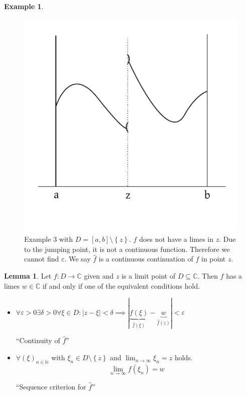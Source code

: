 \documentclass[a4paper,landscape,twocolumn]{article}
\theoremstyle{definition}
\newtheorem{ex}{Example}
\newtheorem{lemma}{Lemma}
\newcommand\set[1]{\left\{#1\right\}}
\newcommand\abs[1]{\left|#1\right|}
\newcommand\seq[1]{{\left(#1\right)}_{n \in \mathbb N}}
\begin{document}
\begin{ex}
\begin{figure}[p]
\begin{center}
      \includegraphics{img/continuity_example_3.pdf}
      \caption{
        Example 3 with $D = [a, b] \setminus \set{z}$.
        $f$ does not have a limes in $z$. Due to the jumping point, it is not a continuous function.
        Therefore we cannot find $\varepsilon$.
        We say $\hat{f}$ is a continuous continuation of $f$ in point $z$.
      }
      \label{img:cont-ex3}
    \end{center}
  \end{figure}
\end{ex}
\begin{lemma}
  Let $f: D \to \mathbb C$ given and $z$ is a limit point of $D \subseteq \mathbb C$.
  Then $f$ has a limes $w \in \mathbb C$ if and only if one of the equivalent conditions hold.
  \begin{itemize}
    \item
      $\forall \varepsilon > 0 \exists \delta > 0 \forall \xi \in D:
      \abs{z - \xi} < \delta
      \implies |\underbrace{f(\xi)}_{\hat{f}(\xi)} - \underbrace{w}_{\hat{f}(z)}| < \varepsilon$
      \begin{center}
        \enquote{Continuity of $\hat{f}$}
      \end{center}
    \item
      $\forall \seq{\xi}$ with $\xi_n \in D \setminus \set{z}$ and $\lim_{n\to\infty} \xi_n = z$ holds.
      \[ \lim_{n\to\infty} f(\xi_n) = w \]
      \begin{center}
        \enquote{Sequence criterion for $\hat{f}$}
      \end{center}
  \end{itemize}
\end{lemma}
\end{document}
